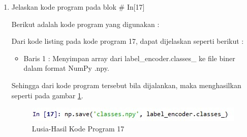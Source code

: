 \begin{enumerate}
\item Jelaskan kode program pada blok \# In[17]
	\par Berikut adalah kode program yang digunakan :
	
	\par Dari kode listing pada kode program 17, dapat dijelaskan seperti berikut :
	\begin{itemize}
	\item Baris 1	: Menyimpan array dari label\_encoder.classes\_ ke file biner dalam format NumPy .npy.
	\end{itemize}
	\par Sehingga dari kode program tersebut bila dijalankan, maka menghasilkan seperti pada gambar \ref{7B17}.
		\begin{figure}[!hbtp]
		\centering
		\includegraphics[scale=0.5]{figures/w17.jpg}
		\caption{Lusia-Hasil Kode Program 17}
		\label{7B17}
		\end{figure}


\end{enumerate}
